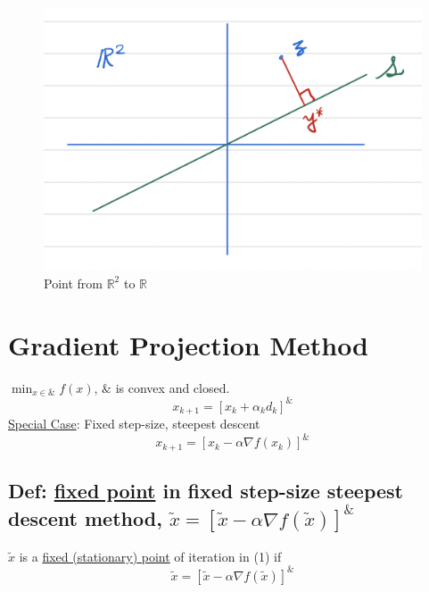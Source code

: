 \documentclass[11pt]{elegantbook}
\begin{document}
\begin{center}\begin{figure}[htbp]
    \centering
    \includegraphics[scale=0.5]{proj1.png}
    \caption{Point from $\mathbb{R}^2$ to $\mathbb{R}$}
    \label{}
\end{figure}\end{center}











\section{Gradient Projection Method}
$\min_{x\in\&}f(x)$, $\&$ is convex and closed.
$$x_{k+1}=[x_k+\alpha_k d_k]^\&$$
\underline{Special Case}: Fixed step-size, steepest descent
\begin{equation}
    x_{k+1}=[x_k-\alpha \nabla f(x_k)]^\&
\end{equation}
\subsection{Def: \underline{fixed point} in fixed step-size steepest descent method, $\tilde{x}=[\tilde{x}-\alpha \nabla f(\tilde{x})]^\&$}
\begin{definition}
    $\tilde{x}$ is a \underline{fixed (stationary) point} of iteration in (1) if $$\tilde{x}=[\tilde{x}-\alpha \nabla f(\tilde{x})]^\&$$
\end{definition}
\end{document}
